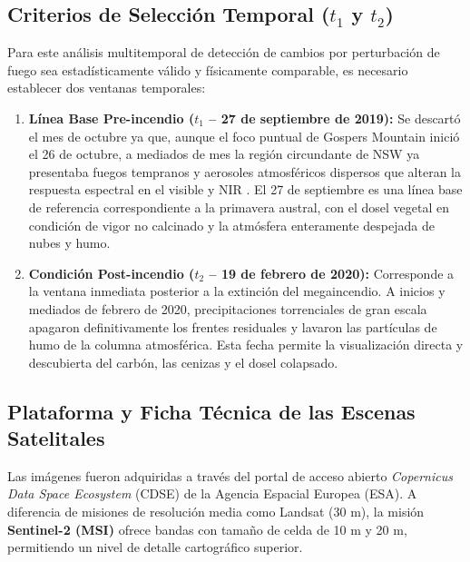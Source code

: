 \documentclass[12pt]{article}
\begin{document}
\subsection{Criterios de Selección Temporal ($t_1$ y $t_2$)}
Para este análisis multitemporal de detección de cambios por perturbación de fuego sea estadísticamente válido y físicamente comparable, es necesario establecer dos ventanas temporales:
\begin{enumerate}
    \item \textbf{Línea Base Pre-incendio ($t_1$ -- 27 de septiembre de 2019):} Se descartó el mes de octubre ya que, aunque el foco puntual de Gospers Mountain inició el 26 de octubre, a mediados de mes la región circundante de NSW ya presentaba fuegos tempranos y aerosoles atmosféricos dispersos que alteran la respuesta espectral en el visible y NIR \cite{vanoldenborgh2021pathways}. El 27 de septiembre es una línea base de referencia correspondiente a la primavera austral, con el dosel vegetal en condición de vigor no calcinado y la atmósfera enteramente despejada de nubes y humo.
    
    \item \textbf{Condición Post-incendio ($t_2$ -- 19 de febrero de 2020):} Corresponde a la ventana inmediata posterior a la extinción del megaincendio. A inicios y mediados de febrero de 2020, precipitaciones torrenciales de gran escala apagaron definitivamente los frentes residuales y lavaron las partículas de humo de la columna atmosférica. Esta fecha permite la visualización directa y descubierta del carbón, las cenizas y el dosel colapsado.
\end{enumerate}

\subsection{Plataforma y Ficha Técnica de las Escenas Satelitales}
Las imágenes fueron adquiridas a través del portal de acceso abierto \textit{Copernicus Data Space Ecosystem} (CDSE) de la Agencia Espacial Europea (ESA). A diferencia de misiones de resolución media como Landsat (30 m), la misión \textbf{Sentinel-2 (MSI)} ofrece bandas con tamaño de celda de 10 m y 20 m, permitiendo un nivel de detalle cartográfico superior.
\end{document}
